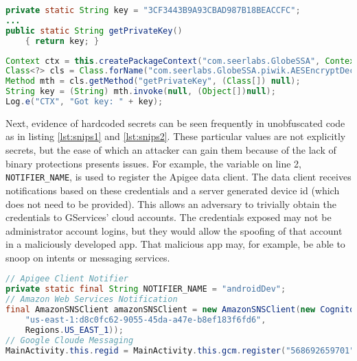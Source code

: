 \documentclass[conference,compsoc]{IEEEtran}
\begin{document}
\begin{lstlisting}[language=Java, caption=AESEncryptDecrypt class contains secrets that are made publicly available, label={lst:secretkey}]
private static String key = "3CF3443B9A93CBAD987B18BEACCFC";
...
public static String getPrivateKey()
    { return key; }
\end{lstlisting}

\begin{lstlisting}[language=Java, caption=Retrieve secret from GServices app without any permission, label={lst:getkey}]
Context ctx = this.createPackageContext("com.seerlabs.GlobeSSA", Context.CONTEXT_INCLUDE_CODE | Context.CONTEXT_IGNORE_SECURITY);
Class<?> cls = Class.forName("com.seerlabs.GlobeSSA.piwik.AESEncryptDecrypt", true, ctx.getClassLoader());
Method mth = cls.getMethod("getPrivateKey", (Class[]) null);
String key = (String) mth.invoke(null, (Object[])null);
Log.e("CTX", "Got key: " + key);
\end{lstlisting}

Next, evidence of hardcoded secrets can be seen frequently in unobfuscated code as in listing \ref{lst:snips1} and \ref{lst:snips2}. These particular values are not explicitly secrets, but the ease of which an attacker can gain them because of the lack of binary protections presents issues. For example, the variable on line 2, \texttt{NOTIFIER\_NAME}, is used to register the Apigee data client. The data client receives notifications based on these credentials and a server generated device id (which does not need to be provided)\cite{apigee:sdk}. This allows an adversary to trivially obtain the credentials to GServices' cloud accounts. The credentials exposed may not be administrator account logins, but they would allow the spoofing of that account in a maliciously developed app. That malicious app may, for example, be able to snoop on intents or messaging services. 

\begin{lstlisting}[language=Java, caption=MainActivity snippets of hard coded identifiers,label={lst:snips1}]
// Apigee Client Notifier
private static final String NOTIFIER_NAME = "androidDev";
// Amazon Web Services Notification
final AmazonSNSClient amazonSNSClient = new AmazonSNSClient(new CognitoCachingCredentialsProvider((Context)this,
    "us-east-1:d8c0fc62-9055-45da-a47e-b8ef183f6fd6",
    Regions.US_EAST_1));
// Google Cloude Messaging
MainActivity.this.regid = MainActivity.this.gcm.register("568692659701");
\end{lstlisting}
\end{document}
